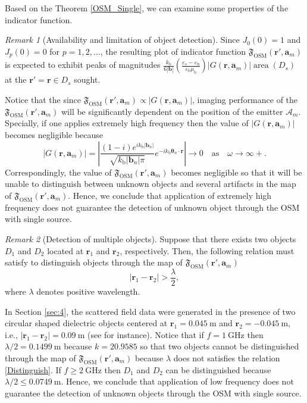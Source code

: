 \documentclass[3p,10pt]{elsarticle}
\newcommand{\eps}{\varepsilon}
\newcommand{\kb}{k_{\mathrm{b}}}
\newcommand{\epsb}{\varepsilon_{\mathrm{b}}}
\newcommand{\mub}{\mu_{\mathrm{b}}}
\newcommand{\ma}{\mathbf{a}}
\newcommand{\mb}{\mathbf{b}}
\newcommand{\mr}{\mathbf{r}}
\newcommand{\mA}{\mathcal{A}}
\newcommand{\vt}{\boldsymbol{\theta}}
\DeclareMathOperator*{\osm}{OSM}
\DeclareMathOperator*{\area}{area}
\theoremstyle{plain}
\theoremstyle{remark}
\newtheorem{remark}{Remark}[section]
\begin{document}
Based on the Theorem \ref{OSM_Single}, we can examine some properties of the indicator function.

\begin{remark}[Availability and limitation of object detection]\label{remark1}
Since $J_0(0)=1$ and $J_p(0)=0$ for $p=1,2,\ldots$, the resulting plot of indicator function $\mathfrak{F}_{\osm}(\mr',\ma_m)$ is expected to exhibit peaks of magnitudes $\frac{\kb}{6|\mb|}\left(\frac{\eps_s-\epsb}{\epsb\mub}\right)|G(\mr,\ma_m)|\area(D_s)$ at the $\mr'=\mr\in D_s$ sought.

Notice that the since $\mathfrak{F}_{\osm}(\mr',\ma_m)\propto|G(\mr,\ma_m)|$, imaging performance of the $\mathfrak{F}_{\osm}(\mr',\ma_m)$ will be significantly dependent on the position of the emitter $\mA_m$. Specially, if one applies extremely high frequency then the value of $|G(\mr,\ma_m)|$ becomes negligible because
\[|G(\mr,\ma_m)|=\left|\frac{(1-i)e^{i\kb|\mb_n|}}{\sqrt{\kb|\mb_n|\pi}}e^{-i\kb\vt_n\cdot\mr}\right|\longrightarrow0\quad\text{as}\quad\omega\longrightarrow\infty+.\]
Correspondingly, the value of $\mathfrak{F}_{\osm}(\mr',\ma_m)$ becomes negligible so that it will be unable to distinguish between unknown objects and several artifacts in the map of $\mathfrak{F}_{\osm}(\mr',\ma_m)$. Hence, we conclude that application of extremely high frequency does not guarantee the detection of unknown object through the OSM with single source.
\end{remark}

\begin{remark}[Detection of multiple objects]\label{remark2}
Suppose that there exists two objects $D_1$ and $D_2$ located at $\mr_1$ and $\mr_2$, respectively. Then, the following relation must satisfy to distinguish objects through the map of $\mathfrak{F}_{\osm}(\mr',\ma_m)$
\begin{equation}\label{Distinguish}
|\mr_1-\mr_2|>\frac{\lambda}{2},
\end{equation}
where $\lambda$ denotes positive wavelength.

In Section \ref{sec:4}, the scattered field data were generated in the presence of two circular shaped dielectric objects centered at $\mr_1=\SI{0.045}{\meter}$ and $\mr_2=-\SI{0.045}{\meter}$, i.e., $|\mr_1-\mr_2|=\SI{0.09}{\meter}$ (see \cite{BS} for instance). Notice that if $f=\SI{1}{\giga\hertz}$ then $\lambda/2=\SI{0.1499}{\meter}$ because $k=20.9585$ so that two objects cannot be distinguished through the map of $\mathfrak{F}_{\osm}(\mr',\ma_m)$ because $\lambda$ does not satisfies the relation \eqref{Distinguish}. If $f\geq\SI{2}{\giga\hertz}$ then $D_1$ and $D_2$ can be distinguished because $\lambda/2\leq\SI{0.0749}{\meter}$. Hence, we conclude that application of low frequency does not guarantee the detection of unknown objects through the OSM with single source.%
\end{remark}
\end{document}

